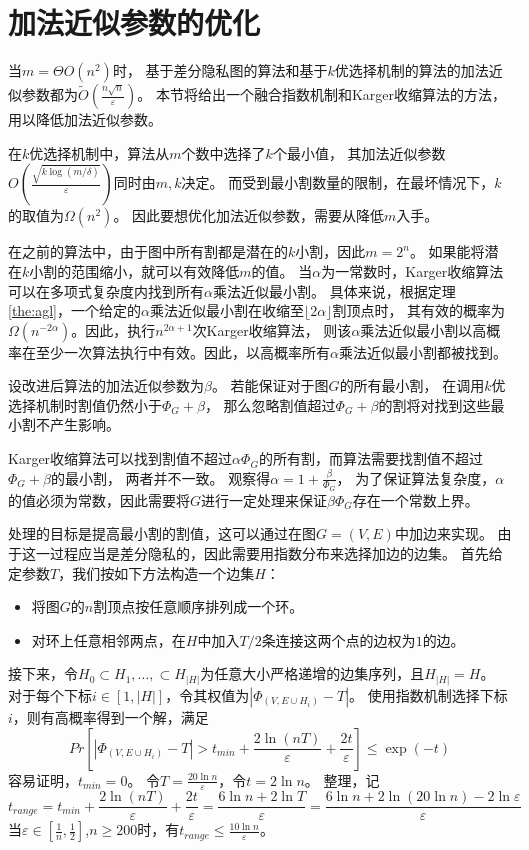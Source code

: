 \section{加法近似参数的优化}

当$m=\Theta O(n^2)$时，
基于差分隐私图的算法和基于$k$优选择机制的算法的加法近似参数都为$\tilde O(\frac{n\sqrt n}{\varepsilon})$。
本节将给出一个融合指数机制和Karger收缩算法的方法，用以降低加法近似参数。

在$k$优选择机制中，算法从$m$个数中选择了$k$个最小值，
其加法近似参数$O(\frac{\sqrt{k\log(m/\delta)}}{\varepsilon})$同时由$m,k$决定。
而受到最小割数量的限制，在最坏情况下，$k$的取值为$\Omega(n^2)$。
因此要想优化加法近似参数，需要从降低$m$入手。

在之前的算法中，由于图中所有割都是潜在的$k$小割，因此$m=2^n$。
如果能将潜在$k$小割的范围缩小，就可以有效降低$m$的值。
当$\alpha$为一常数时，Karger收缩算法可以在多项式复杂度内找到所有$\alpha$乘法近似最小割。
具体来说，根据定理\ref{the:agl}，一个给定的$\alpha$乘法近似最小割在收缩至$\lfloor2\alpha\rfloor$割顶点时，
其有效的概率为$\Omega(n^{-2\alpha})$。因此，执行$n^{2\alpha+1}$次Karger收缩算法，
则该$\alpha$乘法近似最小割以高概率在至少一次算法执行中有效。因此，以高概率所有$\alpha$乘法近似最小割都被找到。

设改进后算法的加法近似参数为$\beta$。
若能保证对于图$G$的所有最小割，
在调用$k$优选择机制时割值仍然小于$\Phi_G+\beta$，
那么忽略割值超过$\Phi_G+\beta$的割将对找到这些最小割不产生影响。

Karger收缩算法可以找到割值不超过$\alpha\Phi_G$的所有割，而算法需要找割值不超过$\Phi_G+\beta$的最小割，
两者并不一致。
观察得$\alpha=1+\frac \beta{\Phi_G}$，
为了保证算法复杂度，$\alpha$的值必须为常数，因此需要将$G$进行一定处理来保证$\beta{\Phi_G}$存在一个常数上界。

处理的目标是提高最小割的割值，这可以通过在图$G=(V,E)$中加边来实现。
由于这一过程应当是差分隐私的，因此需要用指数分布来选择加边的边集。
首先给定参数$T$，我们按如下方法构造一个边集$H$：
\begin{itemize}
    \item 将图$G$的$n$割顶点按任意顺序排列成一个环。
    \item 对环上任意相邻两点，在$H$中加入$T/2$条连接这两个点的边权为$1$的边。
\end{itemize}
接下来，令$H_0\subset H_1,\ldots,\subset H_{|H|}$为任意大小严格递增的边集序列，且$H_{|H|}=H$。
对于每个下标$i\in[1,|H|]$，令其权值为$|\Phi_{(V,E\cup H_i)}-T|$。
使用指数机制选择下标$i$，则有高概率得到一个解，满足
\begin{equation*}
    Pr[|\Phi_{(V,E\cup H_i)}-T|>t_{min}+\frac{2\ln (nT)}{\varepsilon}+\frac{2t}{\varepsilon}]\leq \exp(-t)
\end{equation*}
容易证明，$t_{min}=0$。
令$T=\frac{20\ln n}{\varepsilon}$，令$t=2\ln n$。
整理，记
\begin{equation*}
    t_{range}=t_{min}+\frac{2\ln (nT)}{\varepsilon}+\frac{2t}{\varepsilon}=\frac{6\ln n+2\ln T}{\varepsilon}= \frac{6\ln n+2\ln(20\ln n)-2\ln \varepsilon}{\varepsilon}
\end{equation*}
当$\varepsilon\in[\frac1n,\frac12]$,$n\geq 200$时，有$t_{range}\leq \frac{10\ln n}{\varepsilon}$。


